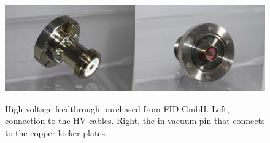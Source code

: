 \begin{figure}%
	\begin{center}
		\includegraphics[width=0.5\textwidth]{./images/FID_feedthrough1}\includegraphics[width=0.5\textwidth]{./images/FID_feedthrough2}
		\caption{High voltage feedthrough purchased from FID GmbH. Left, connection to the HV cables.
		Right, the in vacuum pin that connects to the copper kicker plates.}
		\label{fig:feedthroughs}
	\end{center}
\end{figure}



